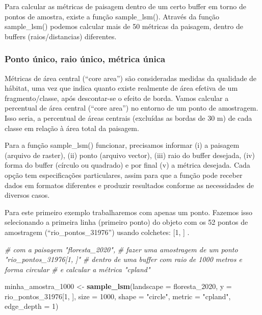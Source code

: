 \documentclass[
]{article}
\newenvironment{Shaded}{\begin{snugshade}}{\end{snugshade}}
\newcommand{\AttributeTok}[1]{\textcolor[rgb]{0.13,0.29,0.53}{#1}}
\newcommand{\CommentTok}[1]{\textcolor[rgb]{0.56,0.35,0.01}{\textit{#1}}}
\newcommand{\DecValTok}[1]{\textcolor[rgb]{0.00,0.00,0.81}{#1}}
\newcommand{\FunctionTok}[1]{\textcolor[rgb]{0.13,0.29,0.53}{\textbf{#1}}}
\newcommand{\NormalTok}[1]{#1}
\newcommand{\OtherTok}[1]{\textcolor[rgb]{0.56,0.35,0.01}{#1}}
\newcommand{\StringTok}[1]{\textcolor[rgb]{0.31,0.60,0.02}{#1}}
\begin{document}
Para calcular as métricas de paisagem dentro de um certo buffer em torno de pontos de amostra, existe a função \colorbox[HTML]{dedede}{sample\_lsm()}. Através da função \colorbox[HTML]{dedede}{sample\_lsm()} podemos calcular mais de 50 métricas da paisagem, dentro de buffers (raios/distancias) diferentes.

\hypertarget{ponto-uxfanico-raio-uxfanico-muxe9trica-uxfanica}{%
\subsubsection{Ponto único, raio único, métrica única}\label{ponto-uxfanico-raio-uxfanico-muxe9trica-uxfanica}}

Métricas de área central (``core area'') são consideradas medidas da qualidade de hábitat, uma vez que indica quanto existe realmente de área efetiva de um fragmento/classe, após descontar-se o efeito de borda. Vamos calcular a percentual de área central (``core area'') no entorno de um ponto de amostragem. Isso seria, a percentual de áreas centrais (excluídas as bordas de 30 m) de cada classe em relação à área total da paisagem.

Para a função \colorbox[HTML]{dedede}{sample\_lsm()} funcionar, precisamos informar
(i) a paisagem (arquivo de raster), (ii) ponto (arquivo vector),
(iii) raio do buffer desejada, (iv) forma do buffer (círculo ou quadrado) e por final (v) a métrica desejada. Cada opção tem especificações particulares, assim para que a função pode receber dados em formatos diferentes e produzir resultados conforme as necessidades de diversos casos.

Para este primeiro exemplo trabalharemos com apenas um ponto. Fazemos isso selecionando a primeira linha (primeiro ponto) do objeto com os 52 pontos de amostragem (``rio\_pontos\_31976'') usando colchetes: \colorbox[HTML]{dedede}{[1, ]} .

\begin{Shaded}
\begin{Highlighting}[]
\CommentTok{\# com a paisagem "floresta\_2020", }
\CommentTok{\# fazer uma amostragem de um ponto "rio\_pontos\_31976[1, ]"}
\CommentTok{\# dentro de uma buffer com raio de 1000 metros e forma circular}
\CommentTok{\# e calcular a métrica "cpland"}

\NormalTok{minha\_amostra\_1000 }\OtherTok{\textless{}{-}} \FunctionTok{sample\_lsm}\NormalTok{(}\AttributeTok{landscape =}\NormalTok{ floresta\_2020, }
                                 \AttributeTok{y =}\NormalTok{ rio\_pontos\_31976[}\DecValTok{1}\NormalTok{, ], }
                                \AttributeTok{size =} \DecValTok{1000}\NormalTok{, }
                                \AttributeTok{shape =} \StringTok{"circle"}\NormalTok{, }
                                \AttributeTok{metric =} \StringTok{"cpland"}\NormalTok{, }
                                \AttributeTok{edge\_depth =} \DecValTok{1}\NormalTok{) }
\end{Highlighting}
\end{Shaded}
\end{document}
